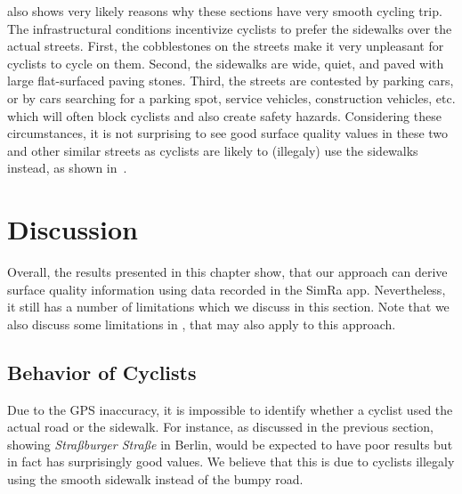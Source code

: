  also shows very likely reasons why these sections have very smooth cycling trip.
The infrastructural conditions incentivize cyclists to prefer the sidewalks over the actual streets.
First, the cobblestones on the streets make it very unpleasant for cyclists to cycle on them.
Second, the sidewalks are wide, quiet, and paved with large flat-surfaced paving stones.
Third, the streets are contested by parking cars, or by cars searching for a parking spot, service vehicles, construction vehicles, etc. which will often block cyclists and also create safety hazards.
Considering these circumstances, it is not surprising to see good surface quality values in these two and other similar streets as cyclists are likely to (illegaly) use the sidewalks instead, as shown in~.

\begin{table}%
\centering
\caption{Surface Quality Analysis Evaluation Results Showing Mean, Median and Standard Deviation of Sections With (Seemingly) Confusing Results}%
\label{tab:mismatch}
\end{table}

\section{Discussion}
\label{sec:discussion_cyclequality}
Overall, the results presented in this chapter show, that our approach can derive surface quality information using data recorded in the SimRa app.
Nevertheless, it still has a number of limitations which we discuss in this section.
Note that we also discuss some limitations in , that may also apply to this approach.


\subsection{Behavior of Cyclists}
\label{subsec:behavior_of_cyclists}
Due to the GPS inaccuracy, it is impossible to identify whether a cyclist used the actual road or the sidewalk.
For instance, as discussed in the previous section,  showing \textit{Straßburger Straße} in Berlin, would be expected to have poor results but in fact has surprisingly good values.
We believe that this is due to cyclists illegaly using the smooth sidewalk instead of the bumpy road.


